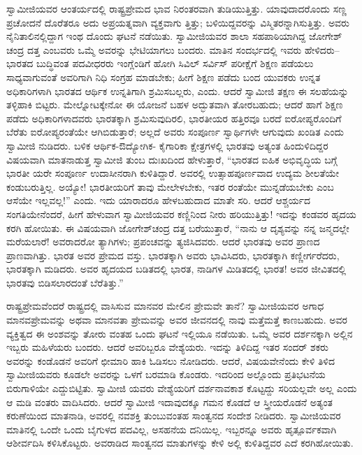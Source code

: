 ಸ್ವಾಮೀಜಿಯವರ ಆಂತರ್ಯದಲ್ಲಿ ರಾಷ್ಟ್ರಪ್ರೇಮದ ಭಾವ ನಿರಂತರವಾಗಿ ತುಡಿಯುತ್ತಿತ್ತು. ಯಾವುದಾದರೊಂದು ಸಣ್ಣ ಪ್ರಚೋದನೆ ದೊರೆತರೂ ಅದು ಅಪ್ರಯತ್ನವಾಗಿ ವ್ಯಕ್ತವಾಗು ತ್ತಿತ್ತು; ಬಳಿಯಿದ್ದವರನ್ನು ವಿಸ್ಮಿತರನ್ನಾಗಿಸುತ್ತಿತ್ತು. ಅವರು ನೈನಿತಾಲಿನಲ್ಲಿದ್ದಾಗ ಇಂಥ ದೊಂದು ಘಟನೆ ನಡೆಯಿತು. ಸ್ವಾಮೀಜಿಯವರ ಶಾಲಾ ಸಹಪಾಠಿಯಾಗಿದ್ದ ಜೋಗೇಶ್​ಚಂದ್ರ ದತ್ತ ಎಂಬವರು ಒಮ್ಮೆ ಅವರನ್ನು ಭೇಟಿಯಾಗಲು ಬಂದರು. ಮಾತಿನ ಸಂದರ್ಭದಲ್ಲಿ ಇವರು ಹೇಳಿದರು–ಭಾರತದ ಬುದ್ಧಿವಂತ ಪದವೀಧರರು ಇಂಗ್ಲೆಂಡಿಗೆ ಹೋಗಿ ಸಿವಿಲ್ ಸರ್ವಿಸ್ ಪರೀಕ್ಷೆಗೆ ಶಿಕ್ಷಣ ಪಡೆಯಲು ಸಾಧ್ಯವಾಗುವಂತೆ ಅವರಿಗಾಗಿ ನಿಧಿ ಸಂಗ್ರಹ ಮಾಡಬೇಕು; ಹೀಗೆ ಶಿಕ್ಷಣ ಪಡೆದು ಬಂದ ಯುವಕರು ಉನ್ನತ ಅಧಿಕಾರಿಗಳಾಗಿ ಭಾರತದ ಆರ್ಥಿಕ ಉನ್ನತಿಗಾಗಿ ಶ್ರಮಿಸಬಲ್ಲರು, ಎಂದು. ಆದರೆ ಸ್ವಾಮೀಜಿ ತಕ್ಷಣ ಈ ಸಲಹೆಯನ್ನು ತಳ್ಳಿಹಾಕಿ ಬಿಟ್ಟರು. ಮೇಲ್ನೋಟಕ್ಕೇನೋ ಈ ಯೋಜನೆ ಬಹಳ ಅದ್ಭುತವಾಗಿ ತೋರಬಹುದು; ಆದರೆ ಹಾಗೆ ಶಿಕ್ಷಣ ಪಡೆದು ಅಧಿಕಾರಿಗಳಾದವರು ಭಾರತಕ್ಕಾಗಿ ಶ್ರಮಿಸುವುದಿರಲಿ, ಭಾರತೀಯರ ಹತ್ತಿರವೂ ಬರದೆ ಐರೋಪ್ಯರೊಂದಿಗೆ ಬೆರೆತು ಐರೋಪ್ಯರಂತೆಯೇ ಆಗಿಬಿಡುತ್ತಾರೆ; ಅಲ್ಲದೆ ಅವರು ಸಂಪೂರ್ಣ ಸ್ವಾರ್ಥಿಗಳೇ ಆಗುವುದು ಖಂಡಿತ ಎಂದು ಸ್ವಾಮೀಜಿ ನುಡಿದರು. ಬಳಿಕ ಆರ್ಥಿಕ-ಔದ್ಯೋಗಿಕ- ಕೈಗಾರಿಕಾ ಕ್ಷೇತ್ರಗಳಲ್ಲಿ ಭಾರತವು ಅತ್ಯಂತ ಹಿಂದುಳಿದಿದ್ದರ ವಿಷಯವಾಗಿ ಮಾತನಾಡುತ್ತ ಸ್ವಾಮೀಜಿ ತುಂಬ ದುಃಖದಿಂದ ಹೇಳುತ್ತಾರೆ, “ಭಾರತದ ಐಹಿಕ ಅಭಿವೃದ್ಧಿಯ ಬಗ್ಗೆ ಭಾರತೀ ಯರೇ ಸಂಪೂರ್ಣ ಉದಾಸೀನರಾಗಿ ಕುಳಿತಿದ್ದಾರೆ. ಅವರಲ್ಲಿ ಉತ್ಸಾಹಪೂರ್ಣವಾದ ಉದ್ಯಮ ಶೀಲತೆಯೇ ಕಂಡುಬರುತ್ತಿಲ್ಲ. ಅಯ್ಯೋ! ಭಾರತೀಯರಿಗೆ ತಾವು ಮೇಲೇಳಬೇಕು, ಇತರ ರಂತೆಯೇ ಮುನ್ನಡೆಯಬೇಕು ಎಂಬ ಆಸೆಯೇ ಇಲ್ಲವಲ್ಲ!” ಎಂದು. ಇದು ಯಾರಾದರೂ ಹೇಳಬಹುದಾದ ಮಾತೇ ಸರಿ. ಆದರೆ ಆಶ್ಚರ್ಯದ ಸಂಗತಿಯೇನೆಂದರೆ, ಹೀಗೆ ಹೇಳುವಾಗ ಸ್ವಾಮೀಜಿಯವರ ಕಣ್ಣಿನಿಂದ ನೀರು ಹರಿಯುತ್ತಿತ್ತು! ಇದನ್ನು ಕಂಡವರ ಹೃದಯ ಕರಗಿ ಹೋಯಿತು. ಈ ವಿಷಯವಾಗಿ ಜೋಗೇಶ್​ಚಂದ್ರ ದತ್ತ ಬರೆಯುತ್ತಾರೆ, “ನಾನು ಆ ದೃಶ್ಯವನ್ನು ನನ್ನ ಜನ್ಮದಲ್ಲೇ ಮರೆಯಲಾರೆ! ಅವರಾದರೋ ತ್ಯಾಗಿಗಳು; ಪ್ರಪಂಚವನ್ನು ತ್ಯಜಿಸಿದವರು. ಆದರೆ ಭಾರತವು ಅವರ ಪ್ರಾಣದ ಪ್ರಾಣವಾಗಿತ್ತು. ಭಾರತ ಅವರ ಪ್ರೇಮದ ವಸ್ತು. ಭಾರತಕ್ಕಾಗಿ ಅವರು ಭಾವಿಸಿದರು, ಭಾರತಕ್ಕಾಗಿ ಕಣ್ಣೀರ್ಗರೆದರು, ಭಾರತಕ್ಕಾಗಿ ಮಡಿದರು. ಅವರ ಹೃದಯದ ಬಡಿತದಲ್ಲಿ ಭಾರತ, ನಾಡಿಗಳ ಮಿಡಿತದಲ್ಲಿ ಭಾರತ! ಅವರ ಜೀವಿತದಲ್ಲಿ ಭಾರತವು ಬಿಡಿಸಲಾರದಂತೆ ಬೆರೆತಿತ್ತು.”

ರಾಷ್ಟ್ರಪ್ರೇಮವೆಂದರೆ ರಾಷ್ಟ್ರದಲ್ಲಿ ವಾಸಿಸುವ ಮಾನವರ ಮೇಲಿನ ಪ್ರೇಮವೇ ತಾನೆ? ಸ್ವಾಮೀಜಿಯವರ ಅಗಾಧ ಮಾನವಪ್ರೇಮವನ್ನು ಅಥವಾ ಮಾನವತಾ ಪ್ರೇಮವನ್ನು ಅವರ ಜೀವನದಲ್ಲಿ ನಾವು ಮತ್ತೆಮತ್ತೆ ಕಾಣಬಹುದು. ಅವರ ವ್ಯಕ್ತಿತ್ವದ ಈ ಅಂಶವನ್ನು ತೋರು ವಂತಹ ಒಂದು ಘಟನೆ ಇಲ್ಲಿಯೂ ನಡೆಯಿತು. ಒಮ್ಮೆ ಅವರ ದರ್ಶನಕ್ಕಾಗಿ ಅಲ್ಲಿನ ಇಬ್ಬರು ಮಹಿಳೆಯರು ಬಂದರು. ಆದರೆ ಅವರಿಬ್ಬರೂ ವೇಶ್ಯೆಯರು. ಇದನ್ನು ತಿಳಿದಿದ್ದ ಇತರ ಸಂದರ್ ಶಕರು ಅವರನ್ನು ಕಂಡೊಡನೆ ಅವರಿಗೆ ಛೀಮಾರಿ ಹಾಕಿ ಓಡಿಸಲು ನೋಡಿದರು. ಆದರೆ, ವಿಷಯವೇನೆಂದು ಕೇಳಿ ತಿಳಿದ ಸ್ವಾಮೀಜಿಯವರು ಕೂಡಲೇ ಅವರನ್ನು ಒಳಗೆ ಬರಮಾಡಿ ಕೊಂಡರು. ಇದರಿಂದ ಅಲ್ಲೊಂದು ಪ್ರತಿಭಟನೆಯ ಬಿರುಗಾಳಿಯೇ ಎದ್ದುಬಿಟ್ಟಿತು. ಸ್ವಾಮೀಜಿ ಯವರು ವೇಶ್ಯೆಯರಿಗೆ ದರ್ಶನಾವಕಾಶ ಕೊಟ್ಟದ್ದು ಸರಿಯಲ್ಲವೇ ಅಲ್ಲ ಎಂದು ಆ ಮಡಿ ವಂತರು ವಾದಿಸಿದರು. ಆದರೆ ಸ್ವಾಮೀಜಿ ಇದಾವುದಕ್ಕೂ ಗಮನ ಕೊಡದೆ ಆ ಸ್ತ್ರೀಯರೊಡನೆ ಅತ್ಯಂತ ಕರುಣೆಯಿಂದ ಮಾತನಾಡಿ, ಅವರಲ್ಲಿ ನವಶಕ್ತಿ ತುಂಬುವಂತಹ ಸಾಂತ್ವನದ ಸಂದೇಶ ನೀಡಿದರು. ಸ್ವಾಮೀಜಿಯವರ ಮಾತಿನಲ್ಲಿ ಒಂದೇ ಒಂದು ಬೈಗುಳದ ಪದವಿಲ್ಲ, ಅಸಹನೆಯ ದನಿಯಿಲ್ಲ. ಇಬ್ಬರನ್ನೂ ಅವರು ಹೃತ್ಪೂರ್ವಕವಾಗಿ ಆಶೀರ್ವದಿಸಿ ಕಳಿಸಿಕೊಟ್ಟರು. ಅವರಾಡಿದ ಸಾಂತ್ವನದ ಮಾತುಗಳನ್ನು ಕೇಳಿ ಅಲ್ಲಿ ಕುಳಿತಿದ್ದವರ ಎದೆ ಕರಗಿಹೋಯಿತು.

